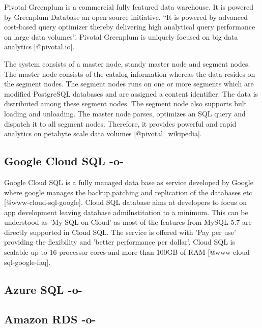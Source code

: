 Pivotal Greenplum is a commercial fully featured data warehouse. It is
powered by Greenplum Database an open source initiative. ``It is
powered by advanced cost-based query optimizer thereby delivering high
analytical query performance on large data volumes''. Pivotal
Greenplum is uniquely focused on big data analytics [@pivotal.io].

The system consists of a master node, standy master node and segment
nodes. The master node consists of the catalog information whereas the
data resides on the segment nodes.  The segment nodes runs on one or
more segments which are modified PostgreSQL databases and are assigned
a content identifier. The data is distributed among these segment
nodes. The segment node also supports bult loading and unloading. The
master node parses, optimizes an SQL query and dispatch it to all
segment nodes. Therefore, it provides powerful and rapid analytics on
petabyte scale data volumes [@pivotal_wikipedia].
     
\subsection{Google Cloud SQL -o-}
     
Google Cloud SQL is a fully managed data base as service developed by
Google where google manages the backup,patching and replication of the
databases etc [@www-cloud-sql-google]. Cloud SQL database aims at
developers to focus on app development leaving database
admilnstitation to a minimum. This can be understood as 'My SQL on
Cloud' as most of the features from MySQL 5.7 are directly supported
in Cloud SQL. The service is offered with 'Pay per use' providing the
flexibility and 'better performance per dollar'.  Cloud SQL is
scalable up to 16 processor cores and more than 100GB of
RAM [@www-cloud-sql-google-faq].


      
\subsection{Azure SQL -o-}



\subsection{Amazon RDS -o-}

